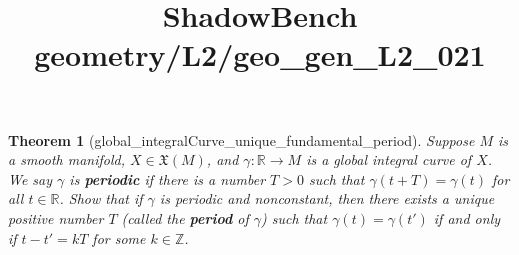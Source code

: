 \documentclass{article}
\title{ShadowBench geometry/L2/geo\_gen\_L2\_021}
\newtheorem{theorem}{Theorem}
\begin{document}
\maketitle

\begin{theorem}[global_integralCurve_unique_fundamental_period]
Suppose $M$ is a smooth manifold, $X \in \mathfrak{X}(M)$, and $\gamma: \mathbb{R} \to M$ is a global integral curve of $X$. We say $\gamma$ is \textbf{periodic} if there is a number $T > 0$ such that $\gamma(t + T) = \gamma(t)$ for all $t \in \mathbb{R}$. Show that if $\gamma$ is periodic and nonconstant, then there exists a unique positive number $T$ (called the \textbf{period} of $\gamma$) such that $\gamma(t) = \gamma(t')$ if and only if $t - t' = kT$ for some $k \in \mathbb{Z}$.
\end{theorem}
\end{document}
